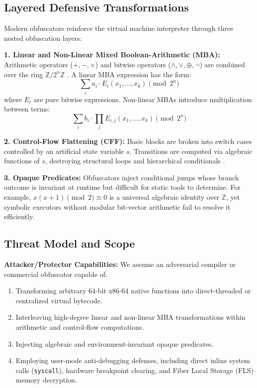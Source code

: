 \documentclass[11pt,a4paper]{article}
\begin{document}
\subsection{Layered Defensive Transformations}
Modern obfuscators reinforce the virtual machine interpreter through three nested obfuscation layers:

\textbf{1. Linear and Non-Linear Mixed Boolean-Arithmetic (MBA):} Arithmetic operators ($+, -, \times$) and bitwise operators ($\land, \lor, \oplus, \neg$) are combined over the ring $\mathbb{Z}/2^n\mathbb{Z}$ \cite{zhou2007}. A linear MBA expression has the form:
\begin{equation}
\sum_{i} a_i \cdot E_i(x_1, \dots, x_k) \pmod{2^n}
\end{equation}
where $E_i$ are pure bitwise expressions. Non-linear MBAs introduce multiplication between terms:
\begin{equation}
\sum_{i} b_i \cdot \prod_{j} E_{i,j}(x_1, \dots, x_k) \pmod{2^n}
\end{equation}

\textbf{2. Control-Flow Flattening (CFF):} Basic blocks are broken into switch cases controlled by an artificial state variable $s$. Transitions are computed via algebraic functions of $s$, destroying structural loops and hierarchical conditionals \cite{wang2000}.

\textbf{3. Opaque Predicates:} Obfuscators inject conditional jumps whose branch outcome is invariant at runtime but difficult for static tools to determine. For example, $x(x+1) \pmod 2 \equiv 0$ is a universal algebraic identity over $\mathbb{Z}$, yet symbolic executors without modular bit-vector arithmetic fail to resolve it efficiently.

\subsection{Threat Model and Scope}
\textbf{Attacker/Protector Capabilities:} We assume an adversarial compiler or commercial obfuscator capable of:
\begin{enumerate}
    \item Transforming arbitrary 64-bit x86-64 native functions into direct-threaded or centralized virtual bytecode.
    \item Interleaving high-degree linear and non-linear MBA transformations within arithmetic and control-flow computations.
    \item Injecting algebraic and environment-invariant opaque predicates.
    \item Employing user-mode anti-debugging defenses, including direct inline system calls (\texttt{syscall}), hardware breakpoint clearing, and Fiber Local Storage (FLS) memory decryption.
\end{enumerate}
\end{document}
